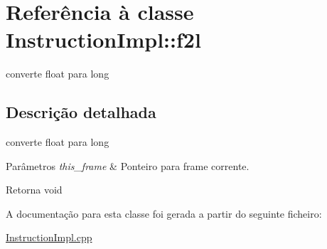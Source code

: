 \hypertarget{class_instruction_impl_1_1f2l}{}\section{Referência à classe Instruction\+Impl\+:\+:f2l}
\label{class_instruction_impl_1_1f2l}


converte float para long  




\subsection{Descrição detalhada}
converte float para long 


\begin{DoxyParams}{Parâmetros}
{\em this\+\_\+frame} & Ponteiro para frame corrente. \\
\hline
\end{DoxyParams}
\begin{DoxyReturn}{Retorna}
void 
\end{DoxyReturn}


A documentação para esta classe foi gerada a partir do seguinte ficheiro\+:\begin{DoxyCompactItemize}
\item 
\hyperlink{_instruction_impl_8cpp}{Instruction\+Impl.\+cpp}\end{DoxyCompactItemize}
